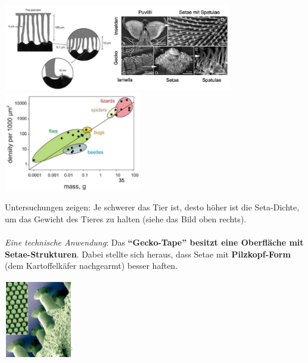 \begin{center}
    \includegraphics[width=10cm]{lec3/figures/vanderwaals.png}
    \hfill
    \includegraphics[width=6cm]{lec3/figures/setadichte.png}
\end{center}
Untersuchungen zeigen: Je schwerer das Tier ist, desto höher ist die Seta-Dichte, um das Gewicht des Tieres zu halten (siehe das Bild oben rechts). 
\\\\
\textit{Eine technische Anwendung}\dangersign: Das \textbf{``Gecko-Tape'' besitzt eine Oberfläche mit Setae-Strukturen}. Dabei stellte sich heraus, dass Setae mit \textbf{Pilzkopf-Form} (dem Kartoffelkäfer nachgearmt) besser haften.

\begin{center}
    \includegraphics[width=3cm]{lec3/figures/pilzkopfform.png}
\end{center}





